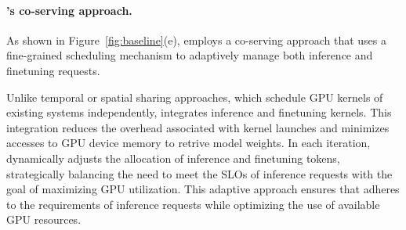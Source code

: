 \paragraph{\sys's co-serving approach.}
As shown in Figure~\ref{fig:baseline}(e), \sys employs a co-serving approach that uses a fine-grained scheduling mechanism to adaptively manage both inference and finetuning requests.

Unlike temporal or spatial sharing approaches, which schedule GPU kernels of existing systems independently, \sys integrates inference and finetuning kernels. This integration reduces the overhead associated with kernel launches and minimizes accesses to GPU device memory to retrive model weights.
%
In each iteration, \sys dynamically adjusts the allocation of inference and finetuning tokens, strategically balancing the need to meet the SLOs of inference requests with the goal of maximizing GPU utilization. This adaptive approach ensures that \sys adheres to the requirements of inference requests while optimizing the use of available GPU resources.

